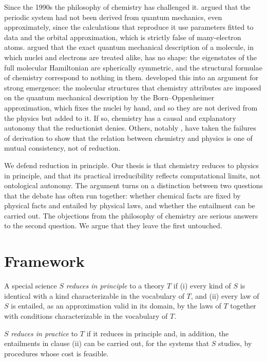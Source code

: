 \documentclass{situationist-preprint}
\begin{document}
Since the 1990s the philosophy of chemistry has challenged it. \citet{Scerri1994} argued that the periodic system had not been derived from quantum mechanics, even approximately, since the calculations that reproduce it use parameters fitted to data and the orbital approximation, which is strictly false of many-electron atoms. \citet{Woolley1978} argued that the exact quantum mechanical description of a molecule, in which nuclei and electrons are treated alike, has no shape: the eigenstates of the full molecular Hamiltonian are spherically symmetric, and the structural formulae of chemistry correspond to nothing in them. \citet{Hendry1998,Hendry2010} developed this into an argument for strong emergence: the molecular structures that chemistry attributes are imposed on the quantum mechanical description by the Born--Oppenheimer approximation, which fixes the nuclei by hand, and so they are not derived from the physics but added to it. If so, chemistry has a causal and explanatory autonomy that the reductionist denies. Others, notably \citet{vanBrakel2000}, have taken the failures of derivation to show that the relation between chemistry and physics is one of mutual consistency, not of reduction.

We defend reduction in principle. Our thesis is that chemistry reduces to physics in principle, and that its practical irreducibility reflects computational limits, not ontological autonomy. The argument turns on a distinction between two questions that the debate has often run together: whether chemical facts are fixed by physical facts and entailed by physical laws, and whether the entailment can be carried out. The objections from the philosophy of chemistry are serious answers to the second question. We argue that they leave the first untouched.

\section{Framework}

\begin{definition}\label{d:inprinciple}
A special science $S$ \emph{reduces in principle} to a theory $T$ if (i) every kind of $S$ is identical with a kind characterizable in the vocabulary of $T$, and (ii) every law of $S$ is entailed, as an approximation valid in its domain, by the laws of $T$ together with conditions characterizable in the vocabulary of $T$.
\end{definition}

\begin{definition}\label{d:inpractice}
$S$ \emph{reduces in practice} to $T$ if it reduces in principle and, in addition, the entailments in clause (ii) can be carried out, for the systems that $S$ studies, by procedures whose cost is feasible.
\end{definition}
\end{document}
